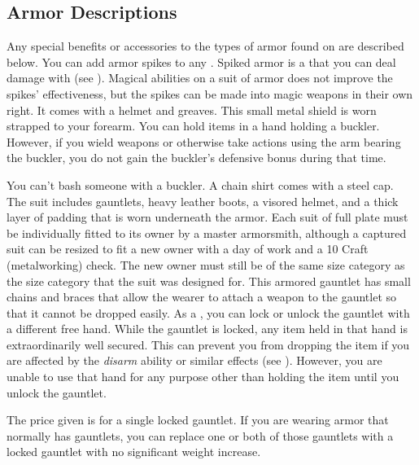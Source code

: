     \subsection{Armor Descriptions}
        Any special benefits or accessories to the types of armor found on  are described below.
         You can add armor spikes to any .
        Spiked armor is a  that you can deal damage with (see ).
        Magical abilities on a suit of armor does not improve the spikes' effectiveness, but the spikes can be made into magic weapons in their own right.
         It comes with a helmet and greaves.
         This small metal shield is worn strapped to your forearm.
        You can hold items in a hand holding a buckler.
        However, if you wield weapons or otherwise take actions using the arm bearing the buckler, you do not gain the buckler's defensive bonus during that time.
        \par You can't bash someone with a buckler.
         A chain shirt comes with a steel cap.
         The suit includes gauntlets, heavy leather boots, a visored helmet, and a thick layer of padding that is worn underneath the armor. Each suit of full plate must be individually fitted to its owner by a master armorsmith, although a captured suit can be resized to fit a new owner with a day of work and a  10 Craft (metalworking) check. The new owner must still be of the same size category as the size category that the suit was designed for.
         This armored gauntlet has small chains and braces that allow the wearer to attach a weapon to the gauntlet so that it cannot be dropped easily.
        As a , you can lock or unlock the gauntlet with a different free hand.
        While the gauntlet is locked, any item held in that hand is extraordinarily well secured.
        This can prevent you from dropping the item if you are affected by the \textit{disarm} ability or similar effects (see ).
        However, you are unable to use that hand for any purpose other than holding the item until you unlock the gauntlet.
        \par The price given is for a single locked gauntlet.
        If you are wearing armor that normally has gauntlets, you can replace one or both of those gauntlets with a locked gauntlet with no significant weight increase.
